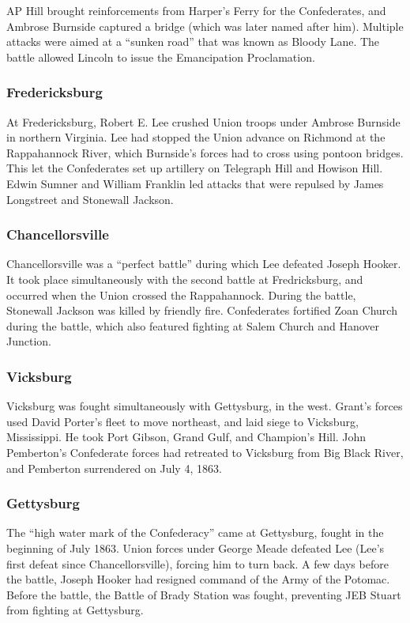 AP Hill brought reinforcements from Harper's Ferry for the Confederates,
and Ambrose Burnside captured a bridge (which was later named after him).
Multiple attacks were aimed at a ``sunken road'' that was known as Bloody Lane.
The battle allowed Lincoln to issue the Emancipation Proclamation.

\subsubsection*{Fredericksburg}

At Fredericksburg, Robert E. Lee crushed Union troops under Ambrose Burnside in northern Virginia.
Lee had stopped the Union advance on Richmond at the Rappahannock River,
which Burnside's forces had to cross using pontoon bridges.
This let the Confederates set up artillery on Telegraph Hill and Howison Hill.
Edwin Sumner and William Franklin led attacks that were repulsed by James Longstreet and Stonewall Jackson.

\subsubsection*{Chancellorsville}

Chancellorsville was a ``perfect battle'' during which Lee defeated Joseph Hooker.
It took place simultaneously with the second battle at Fredricksburg,
and occurred when the Union crossed the Rappahannock.
During the battle, Stonewall Jackson was killed by friendly fire.
Confederates fortified Zoan Church during the battle,
which also featured fighting at Salem Church and Hanover Junction.

\subsubsection*{Vicksburg}

Vicksburg was fought simultaneously with Gettysburg, in the west.
Grant's forces used David Porter's fleet to move northeast, and laid siege to Vicksburg, Mississippi.
He took Port Gibson, Grand Gulf, and Champion's Hill.
John Pemberton's Confederate forces had retreated to Vicksburg from Big Black River,
and Pemberton surrendered on July 4, 1863.

\subsubsection*{Gettysburg}

The ``high water mark of the Confederacy'' came at Gettysburg, fought in the beginning of July 1863.
Union forces under George Meade defeated Lee (Lee's first defeat since Chancellorsville), forcing him to turn back.
A few days before the battle, Joseph Hooker had resigned command of the Army of the Potomac.
Before the battle, the Battle of Brady Station was fought, preventing JEB Stuart from fighting at Gettysburg.

